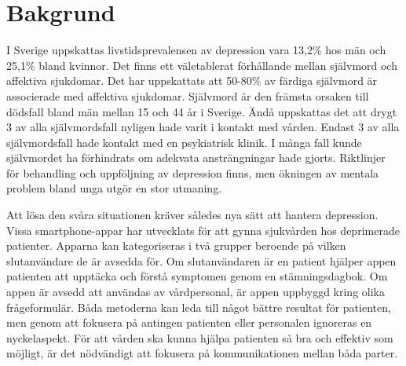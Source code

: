 \documentclass[12pt,a4paper,oneside]{article}
\let\oldcite\cite
\renewcommand*\cite[1]{\textsuperscript{\oldcite{#1}}}
\begin{document}
\begin{abstract}
\ \\\vspace{-2em}\ \\
\bfseries{
H{\"a}lso- och sjukv{\aa}rden beh{\"o}ver nya, kostnadseffektiva verktyg. Hur skulle h{\"a}lso- och sjukv{\aa}rden p{\aa}verkas om prim{\"a}rv{\aa}rden skulle f{\aa} resultat av fr{\aa}geformul{\"a}r fr{\aa}n patientens smartphone? Intervjuer om detta {\"a}mne har utf{\"o}rts med fokusgrupper som inneh{\aa}ller prim{\"a}rv{\aa}rdspersonal p{\aa} Hagfors v{\aa}rdcentral. Inspelningarna unders{\"o}ktes med kvalitativ inneh{\aa}llsanalys. Projektet visar att digitala fr{\aa}geformul{\"a}r har potentialer vid screening och uppf{\"o}ljning.
}
\end{abstract}

\section*{Bakgrund}
I Sverige uppskattas livstidsprevalensen av depression vara 13,2\% hos m{\"a}n och 25,1\% bland kvinnor\cite{numbers0}. Det finns ett v{\"a}letablerat f{\"o}rh{\aa}llande mellan sj{\"a}lvmord och affektiva sjukdomar\cite{numbers1.1}. Det har uppskattats att 50-80\% av f{\"a}rdiga sj{\"a}lvmord {\"a}r associerade med affektiva sjukdomar\cite{numbers1.1}. Sj{\"a}lvmord {\"a}r den fr{\"a}msta orsaken till d{\"o}dsfall bland m{\"a}n mellan 15 och 44 {\aa}r i Sverige\cite{numbers3.0.1}. {\"A}nd{\aa} uppskattas det att drygt  {3} av alla sj{\"a}lvmordsfall nyligen hade varit i kontakt med v{\aa}rden. Endast  {3} av alla sj{\"a}lvmordsfall hade kontakt med en psykiatrisk klinik\cite{numbers2}. I m{\aa}nga fall kunde sj{\"a}lvmordet ha f{\"o}rhindrats om adekvata anstr{\"a}ngningar hade gjorts\cite{numbers1}. Riktlinjer f{\"o}r behandling och uppf{\"o}ljning av depression finns, men {\"o}kningen av mentala problem bland unga utg{\"o}r en stor utmaning\cite{guide1, regionjh1}.

Att l{\"o}sa den sv{\aa}ra situationen kr{\"a}ver s{\aa}ledes nya s{\"a}tt att hantera depression. Vissa smartphone-appar har utvecklats f{\"o}r att gynna sjukv{\aa}rden hos deprimerade patienter. Apparna kan kategoriseras i tv{\aa} grupper beroende p{\aa} vilken slutanv{\"a}ndare de {\"a}r avsedda f{\"o}r. Om slutanv{\"a}ndaren {\"a}r en patient hj{\"a}lper appen patienten att uppt{\"a}cka och f{\"o}rst{\aa} symptomen genom en st{\"a}mningsdagbok\cite {app1}. Om appen {\"a}r avsedd att anv{\"a}ndas av v{\aa}rdpersonal, {\"a}r appen uppbyggd kring olika fr{\aa}geformul{\"a}r\cite {app2}. B{\aa}da metoderna kan leda till n{\aa}got b{\"a}ttre resultat f{\"o}r patienten, men genom att fokusera p{\aa} antingen patienten eller personalen ignoreras en nyckelaspekt. F{\"o}r att v{\aa}rden ska kunna hj{\"a}lpa patienten s{\aa} bra och effektiv som m{\"o}jligt, {\"a}r det n{\"o}dv{\"a}ndigt att fokusera p{\aa} kommunikationen mellan b{\aa}da parter.
\end{document}
